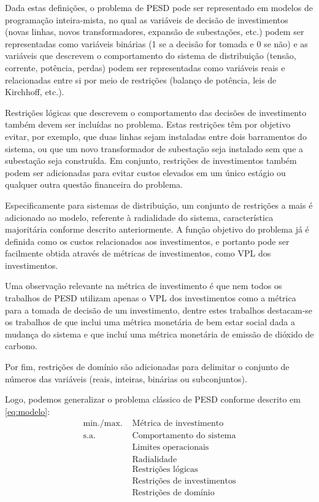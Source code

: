 Dada estas definições, o problema de \ac{PESD} pode ser representado em modelos de programação inteira-mista, no qual as variáveis de decisão de investimentos (novas linhas, novos transformadores, expansão de subestações, etc.) podem ser representadas como variáveis binárias (1 se a decisão for tomada e 0 se não) e as variáveis que descrevem o comportamento do sistema de distribuição (tensão, corrente, potência, perdas) podem ser representadas como variáveis reais e relacionadas entre si por meio de restrições (balanço de potência, leis de Kirchhoff, etc.). 

Restrições lógicas que descrevem o comportamento das decisões de investimento também devem ser incluídas no problema. Estas restrições têm por objetivo evitar, por exemplo, que duas linhas sejam instaladas entre dois barramentos do sistema, ou que um novo transformador de subestação seja instalado sem que a subestação seja construída. Em conjunto, restrições de investimentos também podem ser adicionadas para evitar custos elevados em um único estágio ou qualquer outra questão financeira do problema.

Especificamente para sistemas de distribuição, um conjunto de restrições a mais é adicionado ao modelo, referente à radialidade do sistema, característica majoritária conforme descrito anteriormente. A função objetivo do problema já é definida como os custos relacionados aos investimentos, e portanto pode ser facilmente obtida através de métricas de investimentos, como \ac{VPL} dos investimentos.

Uma observação relevante na métrica de investimento é que nem todos os trabalhos de \ac{PESD} utilizam apenas o \ac{VPL} dos investimentos como a métrica para a tomada de decisão de um investimento, dentre estes trabalhos destacam-se os trabalhos de  que inclui uma métrica monetária de bem estar social dada a mudança do sistema e  que incluí uma métrica monetária de emissão de dióxido de carbono.

Por fim, restrições de domínio são adicionadas para delimitar o conjunto de números das variáveis (reais, inteiras, binárias ou subconjuntos).

Logo, podemos generalizar o problema clássico de \ac{PESD} conforme descrito em \eqref{eq:modelo}:
\begin{align}
        \label{eq:modelo}
        \text{min./max. }& \text{Métrica de investimento} \nonumber\\
        \text{s.a. }& \text{Comportamento do sistema}\nonumber\\
                    & \text{Limites operacionais} \nonumber\\
                    & \text{Radialidade}\\
                    & \text{Restrições lógicas} \nonumber \\
                    & \text{Restrições de investimentos}\nonumber\\
                    & \text{Restrições de domínio}\nonumber
\end{align}

